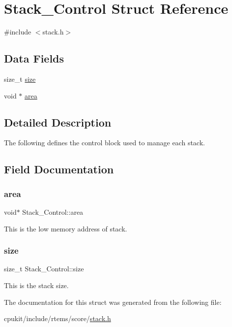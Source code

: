 \hypertarget{structStack__Control}{}\section{Stack\+\_\+\+Control Struct Reference}
\label{structStack__Control}


{\ttfamily \#include $<$stack.\+h$>$}

\subsection*{Data Fields}
\begin{DoxyCompactItemize}
\item 
size\+\_\+t \mbox{\hyperlink{structStack__Control_aa4a78517f38f7de5724f9c813c82d2f4}{size}}
\item 
void $\ast$ \mbox{\hyperlink{structStack__Control_ac23ef2f877f8c2be15c0db9fbb3743d9}{area}}
\end{DoxyCompactItemize}


\subsection{Detailed Description}
The following defines the control block used to manage each stack. 

\subsection{Field Documentation}
\mbox{\label{structStack__Control_ac23ef2f877f8c2be15c0db9fbb3743d9}} 
\subsubsection{\texorpdfstring{area}{area}}
{\footnotesize\ttfamily void$\ast$ Stack\+\_\+\+Control\+::area}

This is the low memory address of stack. \mbox{\label{structStack__Control_aa4a78517f38f7de5724f9c813c82d2f4}} 
\subsubsection{\texorpdfstring{size}{size}}
{\footnotesize\ttfamily size\+\_\+t Stack\+\_\+\+Control\+::size}

This is the stack size. 

The documentation for this struct was generated from the following file\+:\begin{DoxyCompactItemize}
\item 
cpukit/include/rtems/score/\mbox{\hyperlink{cpukit_2include_2rtems_2score_2stack_8h}{stack.\+h}}\end{DoxyCompactItemize}
